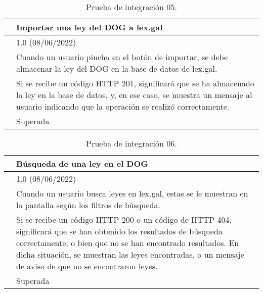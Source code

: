 \begin{table}[H]
\begin{center}
\begin{tabular}{|p{3cm}|p{10cm}|} \hline
\centering {\bf PI-05} & Importar una ley del DOG a lex.gal  \\ \hline\hline
\centering {\bf Versión} & 1.0 (08/06/2022) \\ \hline
\centering {\bf Descripción} & Cuando un usuario pincha en el botón de importar, se debe almacenar la ley del DOG en la base de datos de lex.gal. \\ \hline
\centering {\bf Criterio de aceptación} & Si se recibe un código HTTP 201, significará que se ha almacenado la ley en la base de datos, y, en ese caso, se muestra un mensaje al usuario indicando que la operación se realizó correctamente. \\ \hline
\centering {\bf Estado} & Superada \\ \hline
\end{tabular}
\caption{Prueba de integración 05.}
\label{enlacePI5}
\end{center}
\end{table}

\begin{table}[H]
\begin{center}
\begin{tabular}{|p{3cm}|p{10cm}|} \hline
\centering {\bf PI-06} & Búsqueda de una ley en el DOG  \\ \hline\hline
\centering {\bf Versión} & 1.0 (08/06/2022) \\ \hline
\centering {\bf Descripción} & Cuando un usuario busca leyes en lex.gal, estas se le muestran en la pantalla según los filtros de búsqueda. \\ \hline
\centering {\bf Criterio de aceptación} & Si se recibe un código HTTP 200 o un código de HTTP 404, significará que se han obtenido los resultados de búsqueda correctamente, o bien que no se han encontrado resultados. En dicha situación, se muestran las leyes encontradas, o un mensaje de aviso de que no se encontraron leyes. \\ \hline
\centering {\bf Estado} & Superada \\ \hline
\end{tabular}
\caption{Prueba de integración 06.}
\label{enlacePI6}
\end{center}
\end{table}


